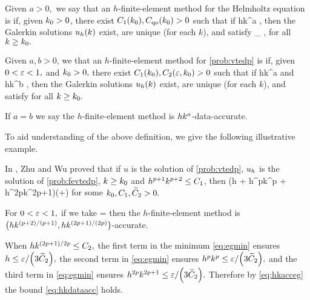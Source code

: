\label{def:hkqo}
Given $a > 0,$ we say that an $h$-finite-element method for the Helmholtz equation is  if, given $k_{0} > 0$, there exist $C_{1}(k_{0}), C_{\mathrm{qo}}(k_{0}) > 0$ such that if
\beqs
hk^{a} \leq \Co,
\eeqs
then the Galerkin solutions $u_{h}(k)$ exist, are unique (for each $k$), and satisfy
\beqs
{} \leq \Cqo \inf_{\vh \in \Vhp} ,
\eeqs
for all $k \geq k_{0}.$
\ede

\label{def:hkdataacc}
Given $a,b>0$, we that an $h$-finite-element method for \cref{prob:vtedp} is  if, given $0 < \varepsilon < 1,$ and $k_{0} > 0,$ there exist $C_{1}(k_{0}), C_{2}(\varepsilon,k_{0}) > 0$ such that if
\beq\label{eq:hkdataacca}
hk^a \leq \Co
\eeq
and
\beq\label{eq:hkdataaccb}
hk^b \leq \Ct,
\eeq
then the Galerkin solutions $u_{h}(k)$ exist, are unique (for each $k$), and satisfy
\beq\label{eq:hkdataacc}
 \leq \eps \quad \tor \quad {} \leq \eps
\eeq
for all $k \geq k_{0}.$

If $a=b$ we say the $h$-finite-element method is $hk^{a}$-data-accurate.
\ede

To aid understanding of the above definition, we give the following illustrative example.

\label{rem:dataacc}
In \cite[Corollary 4.2]{ZhWu:13}, Zhu and Wu proved that if $u$ is the solution of \cref{prob:vtedp}, $u_{h}$ is the solution of \cref{prob:fevtedp}, $k \geq k_{0}$ and $h^{p+1}k^{p+2} \leq C_{1}$,  then
\beq\label{eq:hkacceg}
 \leq \Cttilde \mleft(h + h^pk^p + h^{2p}k^{2p+1}\mright)\mleft(+\NHhGI{\gI}\mright)
\eeq
for some $k_{0}, C_{1}, \widetilde{C}_{2} > 0.$

For $0 < \varepsilon < 1,$ if we take
\beq\label{eq:egmin}
\Ct = \min{}
\eeq
then the $h$-finite-element method is $\hk{(p+2)/(p+1)}{(2p+1)/(2p)}$-accurate.

When $hk^{(2p+1)/2p} \leq C_{2},$ the first term in the minimum \cref{eq:egmin} ensures $h \leq \eps/\mleft(3\Cttilde\mright),$ the second term in \cref{eq:egmin} ensures $h^pk^p \leq \eps/\mleft(3\Cttilde\mright),$ and the third term in \cref{eq:egmin} ensures $h^{2p}k^{2p+1} \leq \eps/\mleft(3\Cttilde\mright).$ Therefore by \cref{eq:hkacceg} the bound \cref{eq:hkdataacc} holds.

